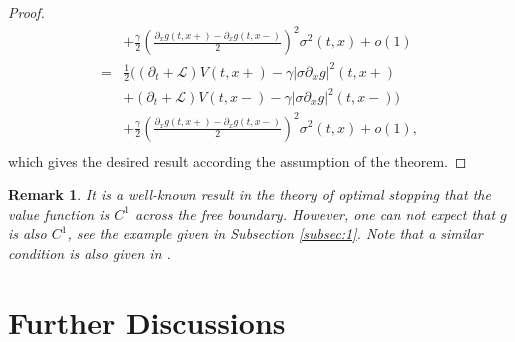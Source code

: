 \documentclass[11pt]{article}
\newtheorem{remark}{Remark}[section]
\begin{document}
\begin{proof}
\begin{equation*}
\begin{split}
&+\frac{\gamma}{2} \left(\frac{\partial_x g(t,x+)-\partial_x g(t,x-)}{2}\right)^2\sigma^2(t,x)+o(1)\\
=&\frac{1}{2}\bigg((\partial_t+\mathcal L)V(t,x+)-\gamma|\sigma \partial_x g|^2(t,x+)\\
&+(\partial_t+\mathcal L)V(t,x-)-\gamma|\sigma \partial_x g|^2(t,x-)\bigg)\\
&+\frac{\gamma}{2} \left(\frac{\partial_x g(t,x+)-\partial_x g(t,x-)}{2}\right)^2\sigma^2(t,x)+o(1),\\
\end{split}
\end{equation*}
which gives the desired result according  the assumption of the theorem.
\end{proof}
\begin{remark}
It is a well-known result in the theory of optimal stopping that the value function is $C^1$ across the free boundary. However, one can not expect that $g$ is also $C^1$, see the example given in Subsection \ref{subsec:1}. Note that a similar condition is also given in \cite{christensen2020time}. 
\end{remark}
\section{Further Discussions}
\end{document}
